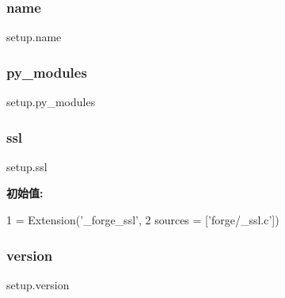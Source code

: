 \mbox{\label{namespacesetup_ab3a7a0638d76a01367c5bc3cc699447f}} 
\subsubsection{\texorpdfstring{name}{name}}
{\footnotesize\ttfamily setup.\+name}

\mbox{\label{namespacesetup_ad6a0f278ba38b7ed3595fd6896196fb3}} 
\subsubsection{\texorpdfstring{py\+\_\+modules}{py\_modules}}
{\footnotesize\ttfamily setup.\+py\+\_\+modules}

\mbox{\label{namespacesetup_aba1552ed5b692ceaa22ff156855dfa50}} 
\subsubsection{\texorpdfstring{ssl}{ssl}}
{\footnotesize\ttfamily setup.\+ssl}

{\bfseries 初始值\+:}
\begin{DoxyCode}
1 =  Extension(\textcolor{stringliteral}{'\_forge\_ssl'},
2         sources = [\textcolor{stringliteral}{'forge/\_ssl.c'}])
\end{DoxyCode}
\mbox{\label{namespacesetup_a2aa722b36a933088812b50ea79b97a5c}} 
\subsubsection{\texorpdfstring{version}{version}}
{\footnotesize\ttfamily setup.\+version}

